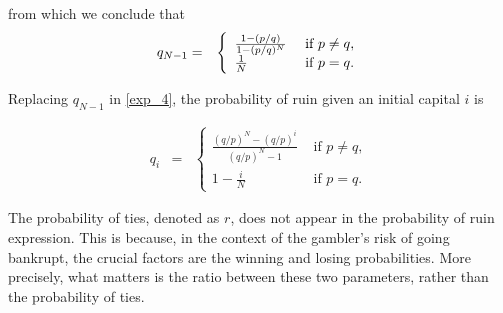 \documentclass[11pt,twoside]{article}
\numberwithin{Theorem}{section}
\numberwithin{Definition}{section}
\numberwithin{Lemma}{section}
\numberwithin{Algorithm}{section}
\numberwithin{equation}{section}
\begin{document}
from which we conclude that
\begin{eqnarray}
q_{N-1}&=& \left\{
\begin{array}{ll}
\frac{1-(p/q)}{1-(p/q)^{N}} & \text{ if } p\neq q,\\
\frac{1}{N}& \text{ if } p= q. \notag
\end{array}
\right.
\end{eqnarray}

Replacing $q_{N-1}$ in \ref{exp_4}, the probability of ruin given an initial capital $i$ is

\begin{eqnarray}
q_{i}&=& \left\{
\begin{array}{ll}
\frac{(q/p)^{N} -(q/p)^{i} }{(q/p)^{N} -1} & \text{ if } p\neq q,\\
1 -\frac{i}{N}& \text{ if } p= q. \label{ruin_proba}
\end{array}
\right.
\end{eqnarray}

The probability of ties, denoted as $r$, does not appear in the probability of ruin expression. This is because, in the context of the gambler's risk of going bankrupt, the crucial factors are the winning and losing probabilities. More precisely, what matters is the ratio between these two parameters, rather than the probability of ties.
\end{document}

